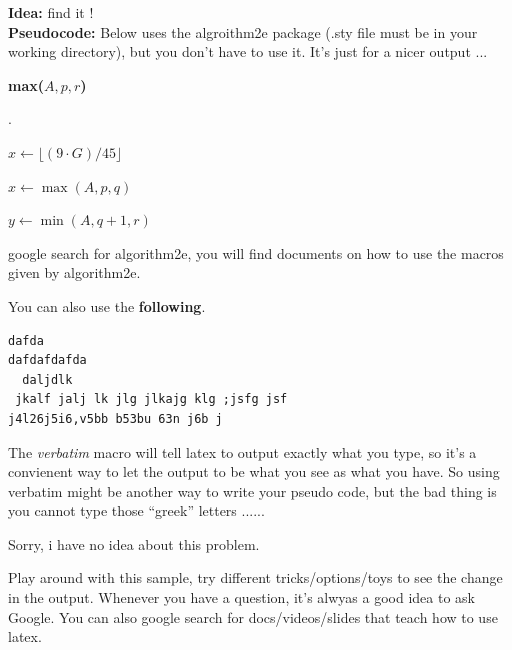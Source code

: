\documentclass[11pt]{article}
\begin{document}
\bigskip



{\bf Idea:} find it ! \\



{\bf Pseudocode:}  Below uses the algroithm2e package (.sty file must
be in your working directory), but you don't have to use it. It's just
for a nicer output ... 


\begin{algorithm}[H]
\NoCaptionOfAlgo
\DontPrintSemicolon
\caption{\bf max($A, p, r$)} 

\bigskip

.

\bigskip

$x \leftarrow \lfloor(9\cdot G)/45\rfloor$
\bigskip

$x \leftarrow \max(A, p, q)$

$y \leftarrow \min(A, q+1, r)$
\bigskip

\end{algorithm}

google search for algorithm2e, you will find documents on how to use
the macros given by algorithm2e.\\


\newpage

You can also use the {\bf following}. 

\begin{verbatim}
dafda
dafdafdafda
  daljdlk 
 jkalf jalj lk jlg jlkajg klg ;jsfg jsf 
j4l26j5i6,v5bb b53bu 63n j6b j
\end{verbatim}

The {\em verbatim} macro will tell latex to output exactly what you
type, so it's a convienent way to let the output to be what you see as
what you have. So using verbatim might be another way to write your
pseudo code, but the bad thing is you cannot type those ``greek''
letters ......  

\bigskip


Sorry, i have no idea about this problem. 

\vspace*{+1cm}

{\LARGE 
Play around with this sample, try different tricks/options/toys to see
the change in the output. Whenever you have a question, it's alwyas a
good idea to ask Google. You can also google search for
docs/videos/slides that teach how to use latex. 
}
\end{document}
